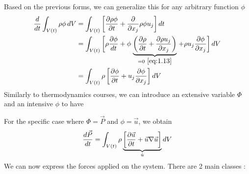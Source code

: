 	Based on the previous forms, we can generalize this for any arbitrary function $\phi$
	\begin{equation}
	\begin{aligned}
		\frac{d}{dt} \int _{V(t)} \rho \phi\, dV  &= \int _{V(t)} \left[\frac{\partial \rho \phi}{\partial t} + \frac{\partial}{\partial x_j} \rho \phi u_j \right] dt \\
		&= \int _{V(t)} \left[ \rho \frac{\partial \phi}{dt} + \phi \right. \underbrace{\left( \frac{\partial \rho}{\partial t} + \frac{\partial \rho u_j}{\partial x_j} \right)}_{= 0\ \eqref{eq:1.13}}\left. + \rho u_j\frac{\partial \phi}{\partial x_j} \right] dV \\
		&= \int _{V(t)} \rho \left[ \frac{\partial \phi}{\partial t} + u_j \frac{\partial \phi}{\partial x_j} \right] dV
	\end{aligned}
	\end{equation}
	Similarly to thermodynamics courses, we can introduce an extensive variable $\Phi$ and an intensive $\phi$ to have 
	\begin{center}
	\end{center}
	For the specific case where $\Phi = \vec{P}$ and $\phi = \vec{u}$, we obtain
	\begin{equation}
		\frac{d\vec{P}}{dt} = \int _{V(t)} \rho \underbrace{\left[ \frac{\partial \vec{u}}{\partial t} + \vec{u} \nabla \vec{u} \right]}_{\dot{u}} dV 
		\label{eq:1.24}
	\end{equation}
	We can now express the forces applied on the system. There are 2 main classes : \\

